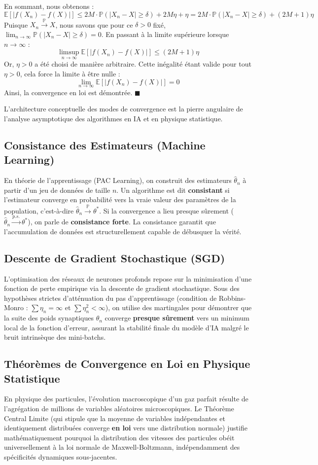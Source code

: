 \documentclass[11pt,a4paper]{article}
\begin{document}
En sommant, nous obtenons :
$$ \mathbb{E}[|f(X_n) - f(X)|] \le 2M \cdot \mathbb{P}(|X_n - X| \ge \delta) + 2M\eta + \eta = 2M \cdot \mathbb{P}(|X_n - X| \ge \delta) + (2M+1)\eta $$
Puisque $X_n \xrightarrow{\mathbb{P}} X$, nous savons que pour ce $\delta > 0$ fixé, $\lim_{n \to \infty} \mathbb{P}(|X_n - X| \ge \delta) = 0$.
En passant à la limite supérieure lorsque $n \to \infty$ :
$$ \limsup_{n \to \infty} \mathbb{E}[|f(X_n) - f(X)|] \le (2M+1)\eta $$
Or, $\eta > 0$ a été choisi de manière arbitraire. Cette inégalité étant valide pour tout $\eta > 0$, cela force la limite à être nulle :
$$ \lim_{n \to \infty} \mathbb{E}[|f(X_n) - f(X)|] = 0 $$
Ainsi, la convergence en loi est démontrée. $\blacksquare$

L'architecture conceptuelle des modes de convergence est la pierre angulaire de l'analyse asymptotique des algorithmes en IA et en physique statistique.

\subsection{Consistance des Estimateurs (Machine Learning)}
En théorie de l'apprentissage (PAC Learning), on construit des estimateurs $\hat{\theta}_n$ à partir d'un jeu de données de taille $n$. Un algorithme est dit \textbf{consistant} si l'estimateur converge en probabilité vers la vraie valeur des paramètres de la population, c'est-à-dire $\hat{\theta}_n \xrightarrow{\mathbb{P}} \theta^*$. Si la convergence a lieu presque sûrement ($\hat{\theta}_n \xrightarrow{p.s.} \theta^*$), on parle de \textbf{consistance forte}. La consistance garantit que l'accumulation de données est structurellement capable de débusquer la vérité.

\subsection{Descente de Gradient Stochastique (SGD)}
L'optimisation des réseaux de neurones profonds repose sur la minimisation d'une fonction de perte empirique via la descente de gradient stochastique. Sous des hypothèses strictes d'atténuation du pas d'apprentissage (condition de Robbins-Monro : $\sum \eta_n = \infty$ et $\sum \eta_n^2 < \infty$), on utilise des martingales pour démontrer que la suite des poids synaptiques $\theta_n$ converge \textbf{presque sûrement} vers un minimum local de la fonction d'erreur, assurant la stabilité finale du modèle d'IA malgré le bruit intrinsèque des mini-batchs.

\subsection{Théorèmes de Convergence en Loi en Physique Statistique}
En physique des particules, l'évolution macroscopique d'un gaz parfait résulte de l'agrégation de millions de variables aléatoires microscopiques. Le Théorème Central Limite (qui stipule que la moyenne de variables indépendantes et identiquement distribuées converge \textbf{en loi} vers une distribution normale) justifie mathématiquement pourquoi la distribution des vitesses des particules obéit universellement à la loi normale de Maxwell-Boltzmann, indépendamment des spécificités dynamiques sous-jacentes.
\end{document}
